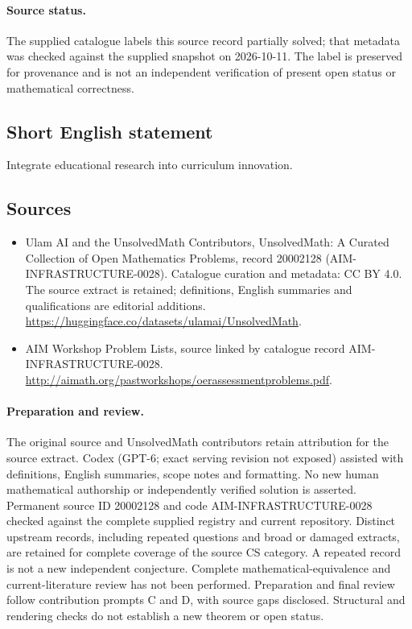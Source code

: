 \documentclass[11pt]{article}
\begin{document}
\paragraph{Source status.}
The supplied catalogue labels this source record partially solved; that metadata was checked against the supplied snapshot on 2026-10-11. The label is preserved for provenance and is not an independent verification of present open status or mathematical correctness.
\subsection{Short English statement}
Integrate educational research into curriculum innovation.
\subsection{Sources}
\begin{itemize}
\item[\hypertarget{source:20002128:1}{S1}] Ulam AI and the UnsolvedMath Contributors, UnsolvedMath: A Curated Collection of Open Mathematics Problems, record 20002128 (AIM-INFRASTRUCTURE-0028). Catalogue curation and metadata: CC BY 4.0. The source extract is retained; definitions, English summaries and qualifications are editorial additions.
\url{https://huggingface.co/datasets/ulamai/UnsolvedMath}.
\item[\hypertarget{source:20002128:2}{S2}] AIM Workshop Problem Lists, source linked by catalogue record AIM-INFRASTRUCTURE-0028.
\url{http://aimath.org/pastworkshops/oerassessmentproblems.pdf}.
\end{itemize}
\paragraph{Preparation and review.}
The original source and UnsolvedMath contributors retain attribution for the source extract. Codex (GPT-6; exact serving revision not exposed) assisted with definitions, English summaries, scope notes and formatting. No new human mathematical authorship or independently verified solution is asserted. Permanent source ID 20002128 and code AIM-INFRASTRUCTURE-0028 checked against the complete supplied registry and current repository. Distinct upstream records, including repeated questions and broad or damaged extracts, are retained for complete coverage of the source CS category. A repeated record is not a new independent conjecture. Complete mathematical-equivalence and current-literature review has not been performed. Preparation and final review follow contribution prompts C and D, with source gaps disclosed. Structural and rendering checks do not establish a new theorem or open status.
\label{end:20002128}
\end{document}
